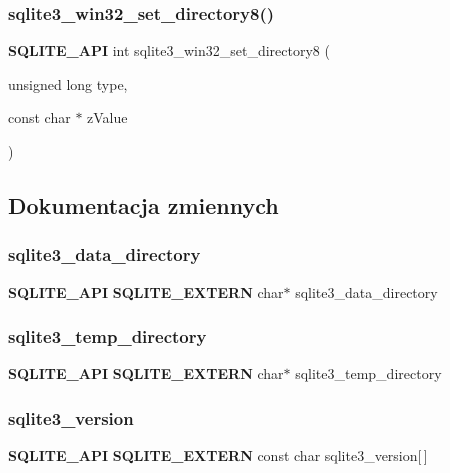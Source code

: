 \subsubsection{sqlite3\_win32\_set\_directory8()}
{\footnotesize\ttfamily \textbf{ S\+Q\+L\+I\+T\+E\+\_\+\+A\+PI} int sqlite3\+\_\+win32\+\_\+set\+\_\+directory8 (\begin{DoxyParamCaption}\item[{unsigned long}]{type,  }\item[{const char $\ast$}]{z\+Value }\end{DoxyParamCaption})}



\subsection{Dokumentacja zmiennych}
\mbox{\label{sqlite3_8h_af29d40d81e4bf9db822f4064f566a8e0}} 
\subsubsection{sqlite3\_data\_directory}
{\footnotesize\ttfamily \textbf{ S\+Q\+L\+I\+T\+E\+\_\+\+A\+PI} \textbf{ S\+Q\+L\+I\+T\+E\+\_\+\+E\+X\+T\+E\+RN} char$\ast$ sqlite3\+\_\+data\+\_\+directory}

\mbox{\label{sqlite3_8h_afd8d1c91c331c15618fa628d57e78042}} 
\subsubsection{sqlite3\_temp\_directory}
{\footnotesize\ttfamily \textbf{ S\+Q\+L\+I\+T\+E\+\_\+\+A\+PI} \textbf{ S\+Q\+L\+I\+T\+E\+\_\+\+E\+X\+T\+E\+RN} char$\ast$ sqlite3\+\_\+temp\+\_\+directory}

\mbox{\label{sqlite3_8h_a306f7b16a705d89fffc05853bba81aeb}} 
\subsubsection{sqlite3\_version}
{\footnotesize\ttfamily \textbf{ S\+Q\+L\+I\+T\+E\+\_\+\+A\+PI} \textbf{ S\+Q\+L\+I\+T\+E\+\_\+\+E\+X\+T\+E\+RN} const char sqlite3\+\_\+version[$\,$]}

